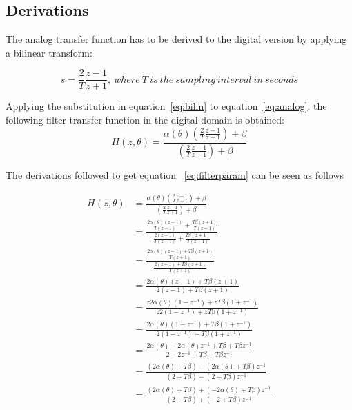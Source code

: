 \documentclass[journal]{IEEEtran}
\begin{document}
\begin{appendices}

\section{Derivations}
The analog transfer function has to be derived to the digital version by applying a bilinear transform:

\begin{equation}\label{eq:bilin}
s = \frac{2}{T} \frac{z-1}{z+1},\: where\:T\:is\:the\:sampling\:interval\:in\:seconds
\end{equation}


Applying the substitution in equation~\ref{eq:bilin} to equation~\ref{eq:analog}, the following filter transfer function in the digital domain is obtained:
\begin{equation}\label{eq:filter}
H\left( z,\theta\right) = \frac{\alpha (\theta)(\frac{2}{T} \frac{z-1}{z+1})+\beta}{(\frac{2}{T} \frac{z-1}{z+1})+\beta}
\end{equation}

The derivations followed to get equation ~\ref{eq:filterparam} can be seen as follows

\begin{equation*}\label{eq:DerivationFilterCoeff}
\begin{split}
H\left( z,\theta\right) &=\frac{\alpha (\theta)(\frac{2}{T} \frac{z-1}{z+1})+\beta}{(\frac{2}{T} \frac{z-1}{z+1})+\beta}\\
                                   &= \frac{\frac{2\alpha (\theta)(z-1)}{T(z+1)}+\frac{T\beta(z+1)}{T(z+1)}}{\frac{2(z-1)}{T(z+1)}+\frac{T\beta(z+1)}{T(z+1)}}\\  
			   &=\frac{\frac{2\alpha (\theta)(z-1)+T\beta(z+1)}{T(z+1)}}{\frac{2(z-1)+T\beta(z+1)}{T(z+1)}}\\
			  &=\frac{2\alpha (\theta)(z-1)+T\beta(z+1)}{2(z-1)+T\beta(z+1)}\\
			 &=\frac{z2\alpha (\theta)(1-z^{-1})+zT\beta(1+z^{-1})}{z2(1-z^{-1})+zT\beta(1+z^{-1})}\\
			&=\frac{2\alpha (\theta)(1-z^{-1})+T\beta(1+z^{-1})}{2(1-z^{-1})+T\beta(1+z^{-1})}\\
			&=\frac{2\alpha (\theta)-2\alpha (\theta)z^{-1}+T\beta+T\beta z^{-1}}{2-2z^{-1}+T\beta+T\beta z^{-1}}\\
			&=\frac{(2\alpha (\theta)+T\beta)-(2\alpha (\theta)+T\beta)z^{-1}}{(2+T\beta)-(2+T\beta)z^{-1}}\\
			&=\frac{(2\alpha (\theta)+T\beta)+(-2\alpha (\theta)+T\beta)z^{-1}}{(2+T\beta)+(-2+T\beta)z^{-1}}\\
\end{split}
\end{equation*} 




\end{appendices}
\end{document}
